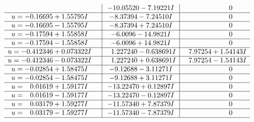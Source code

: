 \documentclass[1p]{elsarticle_modified}
\theoremstyle{definition}
\begin{document}
$$\begin{array}{c|c|c}
 & -10.05520 - 7.19221 I & \phantom{-0.000000 } 0 \\ \hline\begin{aligned}
u &= -0.16695 + 1.55795 I\end{aligned}
 & -8.37394 - 7.24510 I & \phantom{-0.000000 } 0 \\ \hline\begin{aligned}
u &= -0.16695 - 1.55795 I\end{aligned}
 & -8.37394 + 7.24510 I & \phantom{-0.000000 } 0 \\ \hline\begin{aligned}
u &= -0.17594 + 1.55858 I\end{aligned}
 & -6.0096 - 14.9821 I & \phantom{-0.000000 } 0 \\ \hline\begin{aligned}
u &= -0.17594 - 1.55858 I\end{aligned}
 & -6.0096 + 14.9821 I & \phantom{-0.000000 } 0 \\ \hline\begin{aligned}
u &= -0.412346 + 0.073322 I\end{aligned}
 & \phantom{-}1.227240 - 0.638691 I & \phantom{-}7.97254 + 1.54143 I \\ \hline\begin{aligned}
u &= -0.412346 - 0.073322 I\end{aligned}
 & \phantom{-}1.227240 + 0.638691 I & \phantom{-}7.97254 - 1.54143 I \\ \hline\begin{aligned}
u &= -0.02854 + 1.58475 I\end{aligned}
 & -9.12688 - 3.11271 I & \phantom{-0.000000 } 0 \\ \hline\begin{aligned}
u &= -0.02854 - 1.58475 I\end{aligned}
 & -9.12688 + 3.11271 I & \phantom{-0.000000 } 0 \\ \hline\begin{aligned}
u &= \phantom{-}0.01619 + 1.59177 I\end{aligned}
 & -13.22470 + 0.12897 I & \phantom{-0.000000 } 0 \\ \hline\begin{aligned}
u &= \phantom{-}0.01619 - 1.59177 I\end{aligned}
 & -13.22470 - 0.12897 I & \phantom{-0.000000 } 0 \\ \hline\begin{aligned}
u &= \phantom{-}0.03179 + 1.59277 I\end{aligned}
 & -11.57340 + 7.87379 I & \phantom{-0.000000 } 0 \\ \hline\begin{aligned}
u &= \phantom{-}0.03179 - 1.59277 I\end{aligned}
 & -11.57340 - 7.87379 I & \phantom{-0.000000 } 0\\
 \hline 
 \end{array}$$\newpage
\end{document}
